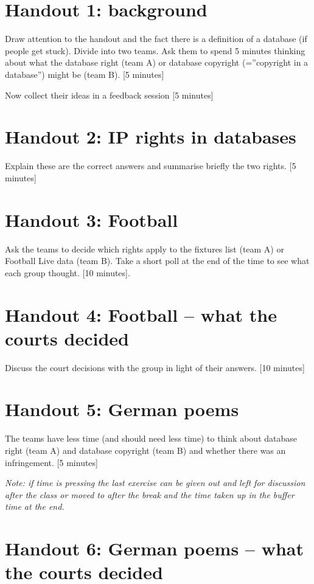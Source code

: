 \section{Handout 1: background}

Draw attention to the handout and the fact there is a definition of a
database (if people get stuck). Divide into two teams. Ask them to spend
5 minutes thinking about what the database right (team A) or database
copyright (=''copyright in a database'') might be (team B). {[}5
minutes{]}

Now collect their ideas in a feedback session {[}5 minutes{]}

\section{Handout 2: IP rights in databases}

Explain these are the correct answers and summarise briefly the two
rights. {[}5 minutes{]}

\section{Handout 3: Football}

Ask the teams to decide which rights apply to the fixtures list (team A)
or Football Live data (team B). Take a short poll at the end of the time
to see what each group thought. {[}10 minutes{]}.

\section{Handout 4: Football -- what the courts decided}

Discuss the court decisions with the group in light of their answers.
{[}10 minutes{]}

\section{Handout 5: German poems}

The teams have less time (and should need less time) to think about
database right (team A) and database copyright (team B) and whether
there was an infringement. {[}5 minutes{]}

\emph{Note: if time is pressing the last exercise can be given out and
left for discussion after the class or moved to after the break and the
time taken up in the buffer time at the end.}

\section{Handout 6: German poems -- what the courts decided}

